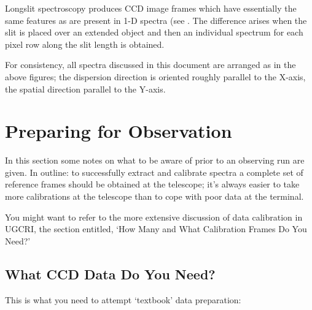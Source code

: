 Longslit spectroscopy produces CCD image frames which have essentially
the same features as are present in 1-D spectra (see
. The
difference arises when the slit is placed over an extended object and
then an individual spectrum for each pixel row along the slit length
is obtained.

For consistency, all spectra discussed in this document are arranged
as in the above figures; the dispersion direction is oriented roughly
parallel to the X-axis, the spatial direction parallel to the Y-axis.




\section{Preparing for Observation}

In this section some notes on what to be aware of prior to an observing
run are given.
In outline: to successfully extract and calibrate spectra
a complete set of reference frames should be obtained at the telescope;
it's always easier to take more calibrations at the telescope than to
cope with poor data at the terminal.

You might want to refer to the more extensive discussion of
 data calibration in UGCRI\cite{ugcri},
the section entitled, `How Many and What Calibration Frames
Do You Need?'


\subsection{What CCD Data Do You Need?}

This is what you need to attempt `textbook' data preparation:

